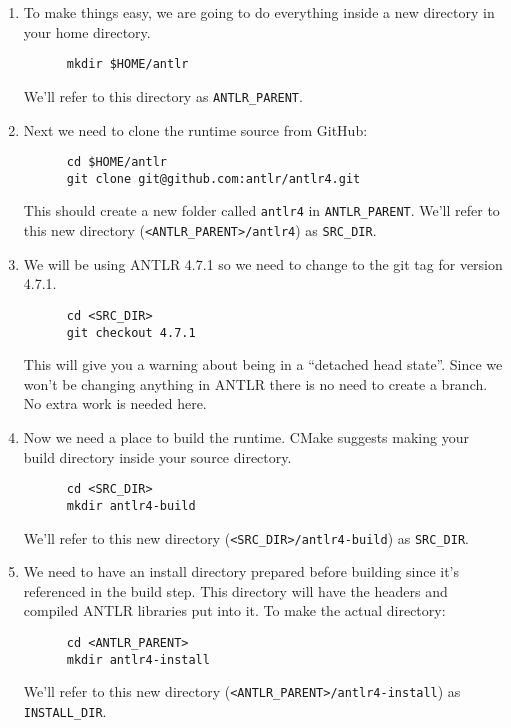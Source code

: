 \documentclass[../setup.tex]{subfiles}
\begin{document}
\begin{enumerate}
  \item
    To make things easy, we are going to do everything inside a new directory in your home
    directory.
    \begin{lstlisting}
      mkdir $HOME/antlr
    \end{lstlisting}
    We'll refer to this directory as \lstinline{ANTLR_PARENT}.
  \item
    Next we need to clone the runtime source from GitHub:
    \begin{lstlisting}
      cd $HOME/antlr
      git clone git@github.com:antlr/antlr4.git
    \end{lstlisting}
    This should create a new folder called \lstinline{antlr4} in \lstinline{ANTLR_PARENT}. We'll
    refer to this new directory (\lstinline{<ANTLR_PARENT>/antlr4}) as \lstinline{SRC_DIR}.
  \item
    We will be using ANTLR 4.7.1 so we need to change to the git tag for version 4.7.1.
    \begin{lstlisting}
      cd <SRC_DIR>
      git checkout 4.7.1
    \end{lstlisting}
    This will give you a warning about being in a ``detached head state''. Since we won't be
    changing anything in ANTLR there is no need to create a branch. No extra work is needed here.
  \item
    Now we need a place to build the runtime. CMake suggests making your build directory inside
    your source directory.
    \begin{lstlisting}
      cd <SRC_DIR>
      mkdir antlr4-build
    \end{lstlisting}
    We'll refer to this new directory (\lstinline{<SRC_DIR>/antlr4-build}) as \lstinline{SRC_DIR}.
  \item
    We need to have an install directory prepared before building since it's referenced in the
    build step. This directory will have the headers and compiled ANTLR libraries put into it.
    To make the actual directory:
    \begin{lstlisting}
      cd <ANTLR_PARENT>
      mkdir antlr4-install
    \end{lstlisting}
    We'll refer to this new directory (\lstinline{<ANTLR_PARENT>/antlr4-install}) as
    \lstinline{INSTALL_DIR}.


\end{enumerate}
\end{document}
